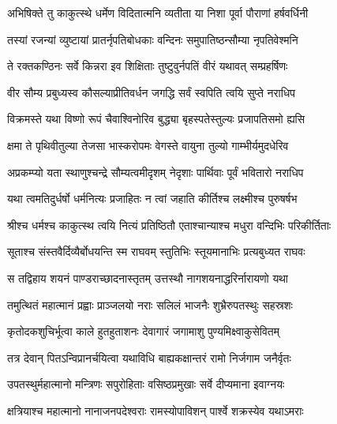
\twolineshloka
{अभिषिक्ते तु काकुत्स्थे धर्मेण विदितात्मनि}
{व्यतीता या निशा पूर्वा पौराणां हर्षवर्धिनी} %

\twolineshloka
{तस्यां रजन्यां व्युष्टायां प्रातर्नृपतिबोधकाः}
{वन्दिनः समुपातिष्ठन्सौम्या नृपतिवेश्मनि} %

\twolineshloka
{ते रक्तकण्ठिनः सर्वे किन्नरा इव शिक्षिताः}
{तुष्टुवुर्नपतिं वीरं यथावत् सम्प्रहर्षिणः} %

\twolineshloka
{वीर सौम्य प्रबुध्यस्व कौसल्याप्रीतिवर्धन}
{जगद्धि सर्वं स्वपिति त्वयि सुप्ते नराधिप} %

\twolineshloka
{विक्रमस्ते यथा विष्णो रूपं चैवाश्विनोरिव}
{बुद्ध्या बृहस्पतेस्तुल्यः प्रजापतिसमो ह्यसि} %

\twolineshloka
{क्षमा ते पृथिवीतुल्या तेजसा भास्करोपमः}
{वेगस्ते वायुना तुल्यो गाम्भीर्यमुदधेरिव} %

\twolineshloka
{अप्रकम्प्यो यता स्थाणुश्चन्द्रे सौम्यत्वमीदृशम्}
{नेदृशाः पार्थिवाः पूर्वं भवितारो नराधिप} %

\twolineshloka
{यथा त्वमतिदुर्धर्षो धर्मनित्यः प्रजाहितः}
{न त्वां जहाति कीर्तिश्च लक्ष्मीश्च पुरुषर्षभ} %

\twolineshloka
{श्रीश्च धर्मश्च काकुत्स्थ त्वयि नित्यं प्रतिष्ठितौ}
{एताश्चान्याश्च मधुरा वन्दिभिः परिकीर्तिताः} %

\twolineshloka
{सूताश्च संस्तवैर्दिव्यैर्बोधयन्ति स्म राघवम्}
{स्तुतिभिः स्तूयमानाभिः प्रत्यबुध्यत राघवः} %

\twolineshloka
{स तद्विहाय शयनं पाण्डराच्छादनास्तृतम्}
{उत्तस्थौ नागशयनाद्धरिर्नारायणो यथा} %

\twolineshloka
{तमुत्थितं महात्मानं प्रह्वाः प्राञ्जलयो नराः}
{सलिलं भाजनैः शुभ्रैरुपतस्थुः सहस्रशः} %

\twolineshloka
{कृतोदकशुचिर्भूत्वा काले हुतहुताशनः}
{देवागारं जगामाशु पुण्यमिक्ष्वाकुसेवितम्} %

\twolineshloka
{तत्र देवान् पितऽन्विप्रानर्चयित्वा यथाविधि}
{बाह्यकक्षान्तरं रामो निर्जगाम जनैर्वृतः} %

\twolineshloka
{उपतस्थुर्महात्मानो मन्त्रिणः सपुरोहिताः}
{वसिष्ठप्रमुखाः सर्वे दीप्यमाना इवाग्नयः} %

\twolineshloka
{क्षत्रियाश्च महात्मानो नानाजनपदेश्वराः}
{रामस्योपाविशन् पार्श्वे शक्रस्येव यथाऽमराः} %

